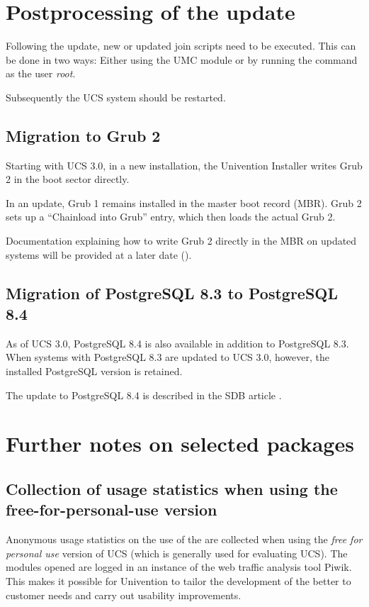 \chapter{Postprocessing of the update}
Following the update, new or updated join scripts need to be executed.
This can be done in two ways: Either using the UMC module 
 or by running the command
 as the user \emph{root}.

Subsequently the UCS system should be restarted.

\section{Migration to Grub 2}
Starting with UCS 3.0, in a new installation, the Univention Installer writes Grub 2 in the
boot sector directly.

In an update, Grub 1 remains installed in the master boot record
(MBR). Grub 2 sets up a ``Chainload into Grub'' entry, which then
loads the actual Grub 2.

Documentation explaining how to write Grub 2 directly in the MBR on
updated systems will be provided at a later date ().

\section{Migration of PostgreSQL 8.3 to PostgreSQL 8.4}
As of UCS 3.0, PostgreSQL 8.4 is also available in addition to
PostgreSQL 8.3. When systems with PostgreSQL 8.3 are updated to UCS
3.0, however, the installed PostgreSQL version is retained.

The update to PostgreSQL 8.4 is described in the SDB
article .


\chapter{Further notes on selected packages}

\section{Collection of usage statistics when using the free-for-personal-use version}

Anonymous usage statistics on the use of the \ucsUMC{} are collected when using the \emph{free for
personal use} version of UCS (which is generally used for evaluating UCS). The modules
opened are logged in an instance of the web traffic analysis tool Piwik. This makes it
possible for Univention to tailor the development of the \ucsUMC{} better to customer needs
and carry out usability improvements.

